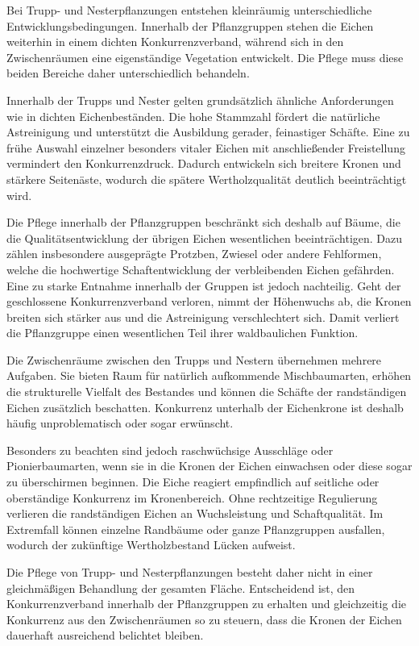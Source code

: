 \documentclass[twocolumn, bibliography=totoc, abstract=true]{scrartcl}
\begin{document}
Bei Trupp- und Nesterpflanzungen entstehen kleinräumig unterschiedliche Entwicklungsbedingungen. Innerhalb der Pflanzgruppen stehen die Eichen weiterhin in einem dichten Konkurrenzverband, während sich in den Zwischenräumen eine eigenständige Vegetation entwickelt. Die Pflege muss diese beiden Bereiche daher unterschiedlich behandeln.

Innerhalb der Trupps und Nester gelten grundsätzlich ähnliche Anforderungen wie in dichten Eichenbeständen. Die hohe Stammzahl fördert die natürliche Astreinigung und unterstützt die Ausbildung gerader, feinastiger Schäfte. Eine zu frühe Auswahl einzelner besonders vitaler Eichen mit anschließender Freistellung vermindert den Konkurrenzdruck. Dadurch entwickeln sich breitere Kronen und stärkere Seitenäste, wodurch die spätere Wertholzqualität deutlich beeinträchtigt wird.

Die Pflege innerhalb der Pflanzgruppen beschränkt sich deshalb auf Bäume, die die Qualitätsentwicklung der übrigen Eichen wesentlichen beeinträchtigen. Dazu zählen insbesondere ausgeprägte Protzben, Zwiesel oder andere Fehlformen, welche die hochwertige Schaftentwicklung der verbleibenden Eichen gefährden. Eine zu starke Entnahme innerhalb der Gruppen ist jedoch nachteilig. Geht der geschlossene Konkurrenzverband verloren, nimmt der Höhenwuchs ab, die Kronen breiten sich stärker aus und die Astreinigung verschlechtert sich. Damit verliert die Pflanzgruppe einen wesentlichen Teil ihrer waldbaulichen Funktion.

Die Zwischenräume zwischen den Trupps und Nestern übernehmen mehrere Aufgaben. Sie bieten Raum für natürlich aufkommende Mischbaumarten, erhöhen die strukturelle Vielfalt des Bestandes und können die Schäfte der randständigen Eichen zusätzlich beschatten. Konkurrenz unterhalb der Eichenkrone ist deshalb häufig unproblematisch oder sogar erwünscht.

Besonders zu beachten sind jedoch raschwüchsige Ausschläge oder Pionierbaumarten, wenn sie in die Kronen der Eichen einwachsen oder diese sogar zu überschirmen beginnen. Die Eiche reagiert empfindlich auf seitliche oder oberständige Konkurrenz im Kronenbereich. Ohne rechtzeitige Regulierung verlieren die randständigen Eichen an Wuchsleistung und Schaftqualität. Im Extremfall können einzelne Randbäume oder ganze Pflanzgruppen ausfallen, wodurch der zukünftige Wertholzbestand Lücken aufweist.

Die Pflege von Trupp- und Nesterpflanzungen besteht daher nicht in einer gleichmäßigen Behandlung der gesamten Fläche. Entscheidend ist, den Konkurrenzverband innerhalb der Pflanzgruppen zu erhalten und gleichzeitig die Konkurrenz aus den Zwischenräumen so zu steuern, dass die Kronen der Eichen dauerhaft ausreichend belichtet bleiben.
\end{document}
